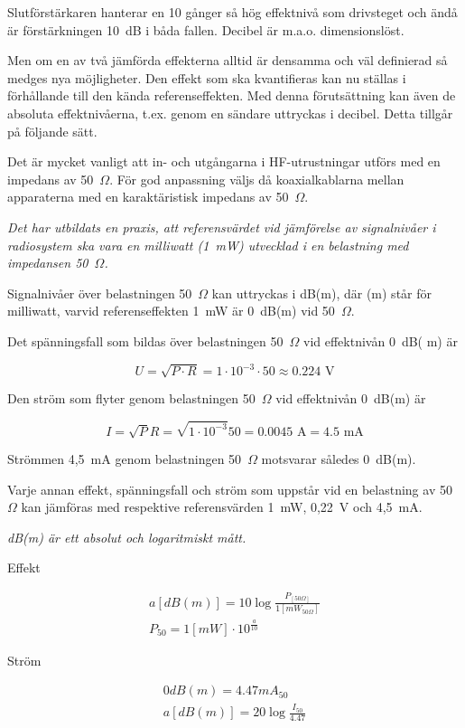 Slutförstärkaren hanterar en 10 gånger så hög effektnivå som
drivsteget och ändå är förstärkningen 10~dB i båda fallen. Decibel är
m.a.o. dimensionslöst.

Men om en av två jämförda effekterna alltid är densamma och väl
definierad så medges nya möjligheter. Den effekt som ska
kvantifieras kan nu ställas i förhållande till den kända
referenseffekten. Med denna förutsättning kan även de absoluta
effektnivåerna, t.ex. genom en sändare uttryckas i decibel. Detta
tillgår på följande sätt.

Det är mycket vanligt att in- och utgångarna i HF-utrustningar utförs
med en impedans av 50~\(\Omega\). För god anpassning väljs då koaxialkablarna
mellan apparaterna med en karaktäristisk impedans av 50~\(\Omega\).

\emph{Det har utbildats en praxis, att referensvärdet vid jämförelse
  av signalnivåer i radiosystem ska vara en milliwatt (1~mW)
  utvecklad i en belastning med impedansen 50~\(\Omega\).}

Signalnivåer över belastningen 50~\(\Omega\) kan uttryckas i dB(m), där (m)
står för milliwatt, varvid referenseffekten 1~mW är 0~dB(m) vid 50~\(\Omega\).

Det spänningsfall som bildas över belastningen 50~\(\Omega\) vid effektnivån
0~dB( m) är

\[U = \sqrt{P\cdot R} = 1\cdot 10^{-3} \cdot 50 \approx 0.224 \text{ V}\]

Den ström som flyter genom belastningen 50~\(\Omega\) vid effektnivån 0~dB(m)
är

\[
I = \sqrt{P}{R} = \sqrt{1\cdot 10^{-3}}{50} = 0.0045 \text{ A} = 4.5 \text{ mA}
\]

Strömmen 4,5~mA genom belastningen 50~\(\Omega\) motsvarar således 0~dB(m).

Varje annan effekt, spänningsfall och ström som uppstår vid en
belastning av 50 \(\Omega\) kan jämföras med respektive referensvärden 1~mW,
0,22~V och 4,5~mA.

\emph{dB(m) är ett absolut och logaritmiskt mått.}

Effekt

\begin{gather*}
  a [dB(m)] = 10 \log\frac{P_{[50\Omega]}}{1[mW_{50\Omega}]} \\
  P_{50} = 1 [mW] \cdot 10^{\frac{a}{10}}
\end{gather*}

Ström

\begin{gather*}
  0 dB(m) = 4.47 mA_{50} \\
  a [dB(m)] = 20 \log\frac{I_{50}}{4.47}
\end{gather*}

